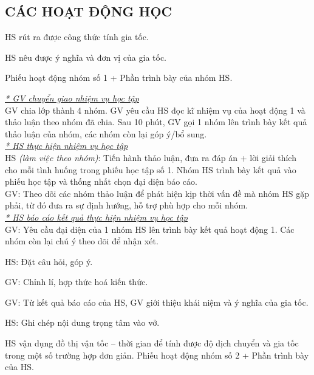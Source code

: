 \subsection{CÁC HOẠT ĐỘNG HỌC}
{HS rút ra được công thức tính gia tốc.
	
HS nêu được ý nghĩa và đơn vị của gia tốc.
}
{
Phiếu hoạt động nhóm số 1 + Phần trình bày của nhóm HS.
}
{
\textit{\underline{* GV chuyển giao nhiệm vụ học tập}}\\
GV chia lớp thành 4 nhóm. GV yêu cầu HS đọc kĩ nhiệm vụ của hoạt động 1 và thảo luận theo nhóm đã chia. Sau 10 phút, GV gọi 1 nhóm lên trình bày kết quả thảo luận của nhóm, các nhóm còn lại góp ý/bổ sung.\\
\textit{\underline{* HS thực hiện nhiệm vụ học tập}}\\
HS \textit{(làm việc theo nhóm)}: Tiến hành thảo luận, đưa ra đáp án + lời giải thích cho mỗi tình huống trong phiếu học tập số 1. Nhóm HS trình bày kết quả vào phiếu học tập và thống nhất chọn đại diện báo cáo.\\
GV: Theo dõi các nhóm thảo luận để phát hiện kịp thời vấn đề mà nhóm HS gặp phải, từ đó đưa ra sự định hướng, hỗ trợ phù hợp cho mỗi nhóm.\\
\textit{\underline{* HS báo cáo kết quả thực hiện nhiệm vụ học tập}}\\
GV: Yêu cầu đại diện của 1 nhóm HS lên trình bày kết quả hoạt động 1. Các nhóm còn lại chú ý theo dõi để nhận xét.

HS: Đặt câu hỏi, góp ý.

GV: Chỉnh lí, hợp thức hoá kiến thức.

GV: Từ kết quả báo cáo của HS, GV giới thiệu khái niệm và ý nghĩa của gia tốc.

HS: Ghi chép nội dung trọng tâm vào vở.
}
{
	HS vận dụng đồ thị vận tốc – thời gian để tính được độ dịch chuyển và gia tốc trong một số trường hợp đơn giản.
}
{
Phiếu hoạt động nhóm số 2 + Phần trình bày của HS.
}
